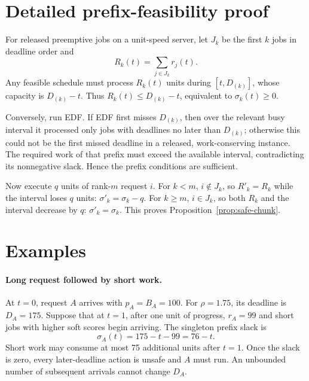 \documentclass{article}
\begin{document}



\clearpage
\appendix

\section{Detailed prefix-feasibility proof}
\label{app:prefix-proof}

For released preemptive jobs on a unit-speed server, let $J_k$ be the first $k$
jobs in deadline order and
\begin{equation}
    R_k(t)=\sum_{j\in J_k}r_j(t).
\end{equation}
Any feasible schedule must process $R_k(t)$ units during $[t,D_{(k)}]$, whose
capacity is $D_{(k)}-t$.  Thus $R_k(t)\leq D_{(k)}-t$, equivalent to
$\sigma_k(t)\geq0$.

Conversely, run EDF.  If EDF first misses $D_{(k)}$, then over the relevant busy
interval it processed only jobs with deadlines no later than $D_{(k)}$;
otherwise this could not be the first missed deadline in a released,
work-conserving instance.  The required work of that prefix must exceed the
available interval, contradicting its nonnegative slack.  Hence the prefix
conditions are sufficient.

Now execute $q$ units of rank-$m$ request $i$.  For $k<m$, $i\notin J_k$, so
$R'_k=R_k$ while the interval loses $q$ units: $\sigma'_k=\sigma_k-q$.  For
$k\geq m$, $i\in J_k$, so both $R_k$ and the interval decrease by $q$:
$\sigma'_k=\sigma_k$.  This proves Proposition~\ref{prop:safe-chunk}.

\section{Examples}
\label{app:examples}

\paragraph{Long request followed by short work.}
At $t=0$, request $A$ arrives with $p_A=B_A=100$.  For $\rho=1.75$, its
deadline is $D_A=175$.  Suppose that at $t=1$, after one unit of progress,
$r_A=99$ and short jobs with higher soft scores begin arriving.  The singleton
prefix slack is
\begin{equation}
    \sigma_A(t)=175-t-99=76-t.
\end{equation}
Short work may consume at most 75 additional units after $t=1$.  Once the slack
is zero, every later-deadline action is unsafe and $A$ must run.  An unbounded
number of subsequent arrivals cannot change $D_A$.
\end{document}
